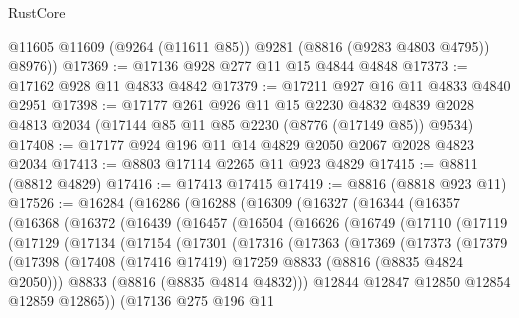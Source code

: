 \begin{lexlean}{RustCore}
\begin{coremodule}
        @11605
        @11609
        (@9264 (@11611 @85))
        @9281
        (@8816 (@9283 @4803 @4795))
        @8976))
@17369 := @17136 @928 @277 @11 @15 @4844 @4848
@17373 := @17162 @928 @11 @4833 @4842
@17379 := @17211 @927 @16 @11 @4833 @4840 @2951
@17398 := @17177
    @261
    @926
    @11
    @15
    @2230
    @4832
    @4839
    @2028
    @4813
    @2034
    (@17144 @85 @11 @85 @2230 (@8776 (@17149 @85)) @9534)
@17408 := @17177 @924 @196 @11 @14 @4829 @2050 @2067 @2028 @4823 @2034
@17413 := @8803 @17114 @2265 @11 @923 @4829
@17415 := @8811 (@8812 @4829)
@17416 := @17413 @17415
@17419 := @8816 (@8818 @923 @11)
@17526 := @16284
    (@16286
      (@16288
        (@16309
          (@16327
            (@16344
              (@16357
                (@16368
                  (@16372
                    (@16439
                      (@16457
                        (@16504
                          (@16626
                            (@16749
                              (@17110
                                (@17119
                                  (@17129
                                    (@17134
                                      (@17154
                                        (@17301
                                          (@17316
                                            (@17363
                                              (@17369
                                                (@17373
                                                  (@17379
                                                    (@17398
                                                      (@17408
                                                        (@17416 @17419)
                                                        @17259
                                                        @8833
                                                        (@8816 (@8835 @4824 @2050)))
                                                      @8833
                                                      (@8816 (@8835 @4814 @4832)))
                                                    @12844
                                                    @12847
                                                    @12850
                                                    @12854
                                                    @12859
                                                    @12865))
                                                (@17136
                                                  @275
                                                  @196
                                                  @11

\end{coremodule}
\end{lexlean}
